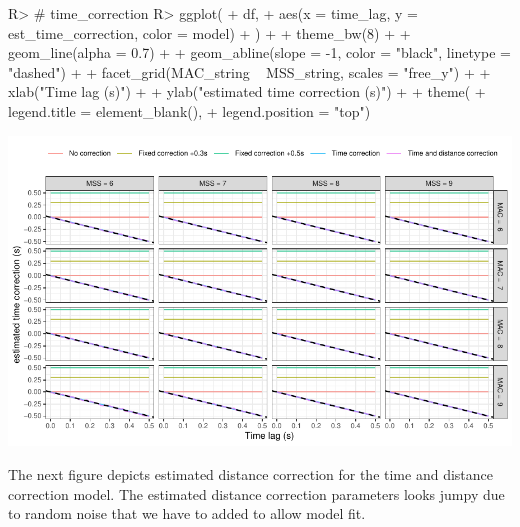 \documentclass[
]{jss}
\begin{document}
\begin{CodeChunk}
\begin{CodeInput}
R> # time_correction
R> ggplot(
+   df,
+   aes(x = time_lag, y = est_time_correction, color = model)
+ ) +
+   theme_bw(8) +
+   geom_line(alpha = 0.7) +
+   geom_abline(slope = -1, color = "black", linetype = "dashed") +
+   facet_grid(MAC_string ~ MSS_string, scales = "free_y") +
+   xlab("Time lag (s)") +
+   ylab("estimated time correction (s)") +
+   theme(
+     legend.title = element_blank(),
+     legend.position = "top")
\end{CodeInput}


\begin{center}\includegraphics[width=1\linewidth]{paper_files/figure-latex/unnamed-chunk-42-1} \end{center}

\end{CodeChunk}

The next figure depicts estimated distance correction for the time and distance correction model. The estimated distance correction parameters looks jumpy due to random noise that we have to added to allow model fit.
\end{document}
